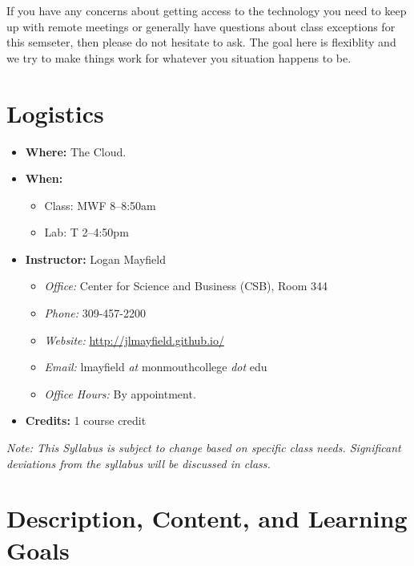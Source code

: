 \documentclass[10pt]{article}
\begin{document}
If you have any concerns about getting access to the technology you need to keep up with
remote meetings or generally have questions about class exceptions for this semseter,
then please do not hesitate to ask. The goal here is flexiblity and we try to make
things work for whatever you situation happens to be.


\section{Logistics}
\begin{itemize}
\item \textbf{Where: } The Cloud.
\item \textbf{When: }
\begin{itemize}
  \item Class: MWF 8--8:50am
  \item Lab: T 2--4:50pm
\end{itemize}
\item \textbf{Instructor: } Logan Mayfield
\begin{itemize}
\item \textit{Office: } Center for Science and Business (CSB), Room 344\footnotemark[2]
\item \textit{Phone: } 309-457-2200 %
\item \textit{Website: } \url{http://jlmayfield.github.io/}
\item \textit{Email: } lmayfield \textit{at} monmouthcollege \textit{dot} edu
\item \textit{Office Hours: }  By appointment.
\end{itemize}
\item \textbf{Credits: } 1 course credit
\end{itemize}
\emph{Note: This Syllabus is subject to change based on specific class needs. Significant deviations from the syllabus will be discussed in class.}


\section{Description, Content, and Learning Goals}
\end{document}
